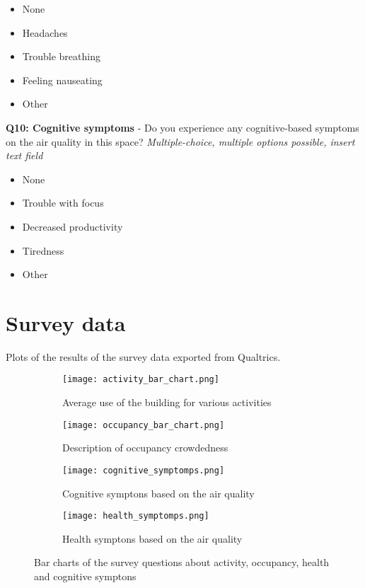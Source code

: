 \begin{appendices}
\begin{itemize}
    \item None
    \item Headaches
    \item Trouble breathing
    \item Feeling nauseating
    \item Other
\end{itemize}

\textbf{Q10: Cognitive symptoms} - Do you experience any cognitive-based symptoms on the air quality in this space? \textit{Multiple-choice, multiple options possible, insert text field}

\begin{itemize}
    \item None
    \item Trouble with focus
    \item Decreased productivity
    \item Tiredness
    \item Other
\end{itemize}


\section{Survey data}
\label{appendix:survey-data}

Plots of the results of the survey data exported from Qualtrics.

\begin{figure}[htbp]
    \centering
    \begin{subfigure}{0.4\textwidth}
        \centering
        \texttt{[image: activity\_bar\_chart.png]}
        \caption{Average use of the building for various activities}
        \label{fig:image1}
    \end{subfigure}
    \hfill
    \begin{subfigure}{0.4\textwidth}
        \centering
        \texttt{[image: occupancy\_bar\_chart.png]}
        \caption{Description of occupancy crowdedness}
        \label{fig:image2}
    \end{subfigure}
    \begin{subfigure}{0.4\textwidth}
        \centering
        \texttt{[image: cognitive\_symptomps.png]}
        \caption{Cognitive symptons based on the air quality}
        \label{fig:image1}
    \end{subfigure}
    \hfill
    \begin{subfigure}{0.4\textwidth}
        \centering
        \texttt{[image: health\_symptomps.png]}
        \caption{Health symptons based on the air quality}
        \label{fig:image2}
    \end{subfigure}    
    \caption{Bar charts of the survey questions about activity, occupancy, health and cognitive symptons}
    \label{fig:grid}
\end{figure}


\end{appendices}
